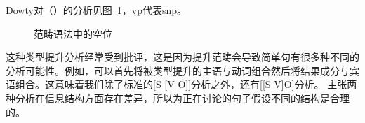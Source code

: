 \begin{exe}
\begin{xlist}[iv.]
\begin{exe}
\begin{xlist}[iv.]
\noindent
Dowty对（）的分析见图~\ref{Abb-CG-Gapping}，vp代表s\bs np。
\begin{figure}
\caption{\label{Abb-CG-Gapping}范畴语法中的空位}
\end{figure}%

这种类型提升分析经常受到批评，这是因为提升范畴会导致简单句有很多种不同的分析可能性。例如，可以首先将被类型提升的主语与动词组合然后将结果成分与宾语组合。这意味着我们除了标准的[S [V O]]分析之外，还有[[S V]O]分析。 \citet{Steedman91a}主张两种分析在信息结构方面存在差异，所以为正在讨论的句子假设不同的结构是合理的。


\end{xlist}
\end{exe}
\end{xlist}
\end{exe}
